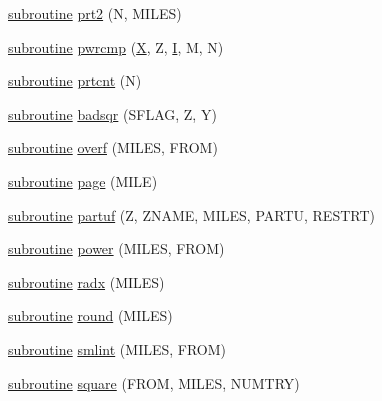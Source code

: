 \begin{DoxyCompactItemize}
\item 
\hyperlink{M__stopwatch_83_8txt_acfbcff50169d691ff02d4a123ed70482}{subroutine} \hyperlink{sparanoia_8f90_a4366a5bd15fdd00f94aacbdc95b58930}{prt2} (N, M\+I\+L\+ES)
\item 
\hyperlink{M__stopwatch_83_8txt_acfbcff50169d691ff02d4a123ed70482}{subroutine} \hyperlink{sparanoia_8f90_afc3a5a8e4b6d1ff954a3b5cfa5d754e0}{pwrcmp} (\hyperlink{intro__blas1_83_8txt_ac8596739bc875e90fe6e2ecf98e87906}{X}, Z, \hyperlink{continue_87_8txt_ae7b8826453d28f1bdb2fba7e889eb23b}{I}, M, N)
\item 
\hyperlink{M__stopwatch_83_8txt_acfbcff50169d691ff02d4a123ed70482}{subroutine} \hyperlink{sparanoia_8f90_a4613c6de1358a9fe77d1a9f4aaa8e1c6}{prtcnt} (N)
\item 
\hyperlink{M__stopwatch_83_8txt_acfbcff50169d691ff02d4a123ed70482}{subroutine} \hyperlink{sparanoia_8f90_afb98e3c2e38e0adf86b1de0b4be26416}{badsqr} (S\+F\+L\+AG, Z, Y)
\item 
\hyperlink{M__stopwatch_83_8txt_acfbcff50169d691ff02d4a123ed70482}{subroutine} \hyperlink{sparanoia_8f90_a38d9bdfaf7f831fbe65011a823b5b39d}{overf} (M\+I\+L\+ES, F\+R\+OM)
\item 
\hyperlink{M__stopwatch_83_8txt_acfbcff50169d691ff02d4a123ed70482}{subroutine} \hyperlink{sparanoia_8f90_a163adc8cbfccbae31bb2adb72adeb9b0}{page} (M\+I\+LE)
\item 
\hyperlink{M__stopwatch_83_8txt_acfbcff50169d691ff02d4a123ed70482}{subroutine} \hyperlink{sparanoia_8f90_ab742eeb0cdf95dcdf1340960ce387095}{partuf} (Z, Z\+N\+A\+ME, M\+I\+L\+ES, P\+A\+R\+TU, R\+E\+S\+T\+RT)
\item 
\hyperlink{M__stopwatch_83_8txt_acfbcff50169d691ff02d4a123ed70482}{subroutine} \hyperlink{sparanoia_8f90_aa0f6d55a5569e0c070c918b0716dc073}{power} (M\+I\+L\+ES, F\+R\+OM)
\item 
\hyperlink{M__stopwatch_83_8txt_acfbcff50169d691ff02d4a123ed70482}{subroutine} \hyperlink{sparanoia_8f90_a91e4601692e8df990b28ad4c7f81c096}{radx} (M\+I\+L\+ES)
\item 
\hyperlink{M__stopwatch_83_8txt_acfbcff50169d691ff02d4a123ed70482}{subroutine} \hyperlink{sparanoia_8f90_ada89e3fa6290059b6cb40cf8c8df33b7}{round} (M\+I\+L\+ES)
\item 
\hyperlink{M__stopwatch_83_8txt_acfbcff50169d691ff02d4a123ed70482}{subroutine} \hyperlink{sparanoia_8f90_a6d17020aa087d1f751f1f0bfcf473d27}{smlint} (M\+I\+L\+ES, F\+R\+OM)
\item 
\hyperlink{M__stopwatch_83_8txt_acfbcff50169d691ff02d4a123ed70482}{subroutine} \hyperlink{sparanoia_8f90_a12b0d14b130071ecf4cd010e35b092c7}{square} (F\+R\+OM, M\+I\+L\+ES, N\+U\+M\+T\+RY)

\end{DoxyCompactItemize}
